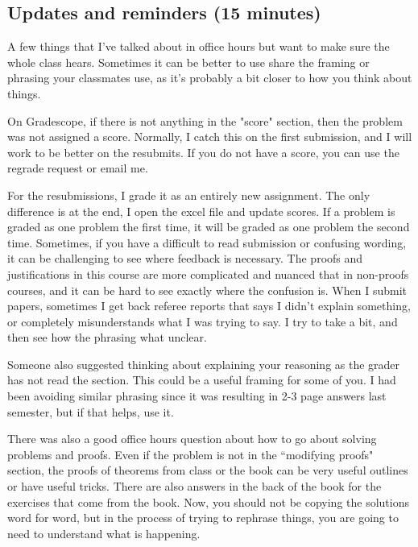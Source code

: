 \documentclass[letterpaper, 11 pt]{article}
\begin{document}
\subsection{Updates and reminders (15 minutes)}
A few things that I've talked about in office hours but want to make sure the whole class hears. Sometimes it can be better to use share the framing or phrasing your classmates use, as it's probably a bit closer to how you think about things.

On Gradescope, if there is not anything in the "score" section, then the problem was not assigned a score. Normally, I catch this on the first submission, and I will work to be better on the resubmits. If you do not have a score, you can use the regrade request or email me. 

For the resubmissions, I grade it as an entirely new assignment. The only difference is at the end, I open the excel file and update scores. If a problem is graded as one problem the first time, it will be graded as one problem the second time. Sometimes, if you have a difficult to read submission or confusing wording, it can be challenging to see where feedback is necessary. The proofs and justifications in this course are more complicated and nuanced that in non-proofs courses, and it can be hard to see exactly where the confusion is. When I submit papers, sometimes I get back referee reports that says I didn't explain something, or completely misunderstands what I was trying to say. I try to take a bit, and then see how the phrasing what unclear. 

Someone also suggested thinking about explaining your reasoning as the grader has not read the section. This could be a useful framing for some of you. I had been avoiding similar phrasing since it was resulting in 2-3 page answers last semester, but if that helps, use it. 

There was also a good office hours question about how to go about solving problems and proofs. Even if the problem is not in the ``modifying proofs" section, the proofs of theorems from class or the book can be very useful outlines or have useful tricks. There are also answers in the back of the book for the exercises that come from the book. Now, you should not be copying the solutions word for word, but in the process of trying to rephrase things, you are going to need to understand what is happening. 

\end{document}

